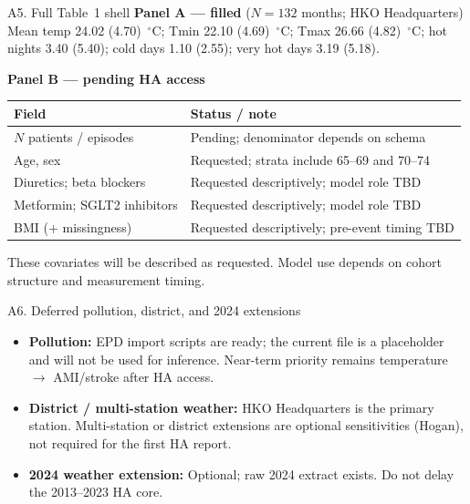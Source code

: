 \documentclass[aspectratio=169,10pt]{beamer}
\begin{document}
\begin{frame}{A5. Full Table~1 shell}
  \footnotesize
  \textbf{Panel A --- filled} ($N=132$ months; HKO Headquarters)\\[0.2em]
  Mean temp 24.02 (4.70)~$^\circ$C; Tmin 22.10 (4.69)~$^\circ$C; Tmax 26.66 (4.82)~$^\circ$C;
  hot nights 3.40 (5.40); cold days 1.10 (2.55); very hot days 3.19 (5.18).

  \vspace{0.5em}
  \textbf{Panel B --- pending HA access}\\[0.2em]
  \begin{tabular}{@{}lp{8.8cm}@{}}
    \toprule
    Field & Status / note \\
    \midrule
    $N$ patients / episodes & Pending; denominator depends on schema \\
    Age, sex & Requested; strata include 65--69 and 70--74 \\
    Diuretics; beta blockers & Requested descriptively; model role TBD \\
    Metformin; SGLT2 inhibitors & Requested descriptively; model role TBD \\
    BMI (+ missingness) & Requested descriptively; pre-event timing TBD \\
    \bottomrule
  \end{tabular}

  \vspace{0.4em}
  \scriptsize
  These covariates will be described as requested. Model use depends on cohort structure and measurement timing.
\end{frame}

\begin{frame}{A6. Deferred pollution, district, and 2024 extensions}
  \footnotesize
  \begin{itemize}
    \item \textbf{Pollution:} EPD import scripts are ready; the current file is a placeholder
      and will not be used for inference. Near-term priority remains
      temperature $\rightarrow$ AMI/stroke after HA access.
    \item \textbf{District / multi-station weather:} HKO Headquarters is the primary
      station. Multi-station or district extensions are optional sensitivities (Hogan),
      not required for the first HA report.
    \item \textbf{2024 weather extension:} Optional; raw 2024 extract exists.
      Do not delay the 2013--2023 HA core.
  \end{itemize}
\end{frame}
\end{document}
